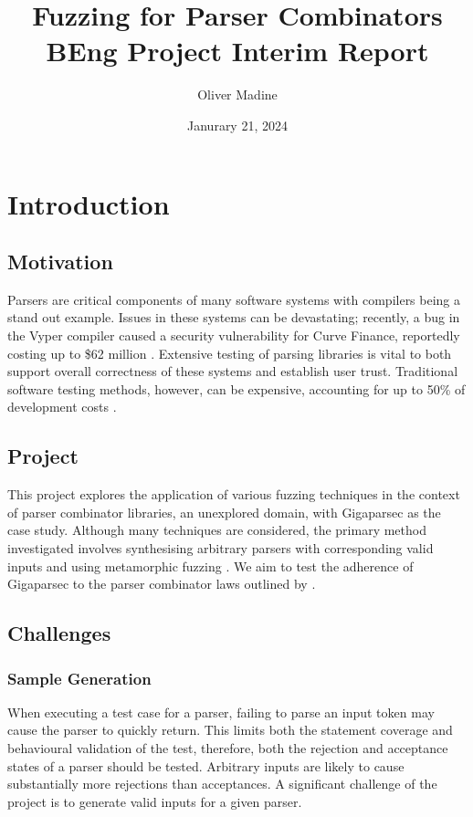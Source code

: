 \documentclass[11pt]{article}
\title{Fuzzing for Parser Combinators \\ {\large BEng Project Interim Report}}
\author{Oliver Madine}
\date{Janurary 21, 2024}
\let\oldciteauthor\citeauthor
\renewcommand{\citeauthor}[1]{\oldciteauthor{#1} \cite{#1}}
\begin{document}
\maketitle

\section{Introduction} %

\subsection{Motivation}
Parsers are critical components of many software systems with compilers being a stand out example. Issues in these systems can be devastating; recently, a bug in the Vyper compiler caused a security vulnerability for Curve Finance, reportedly costing up to \$62 million \cite{curve}. Extensive testing of parsing libraries is vital to both support overall correctness of these systems and establish user trust. Traditional software testing methods, however, can be expensive, accounting for up to 50\% of development costs \cite{quickcheck}.

\subsection{Project}
This project explores the application of various fuzzing techniques in the context of parser combinator libraries, an unexplored domain, with Gigaparsec \cite{gigaparsec} as the case study. Although many techniques are considered, the primary method investigated involves synthesising arbitrary parsers with corresponding valid inputs and using metamorphic fuzzing \cite{metamorphic}. We aim to test the adherence of Gigaparsec to the parser combinator laws outlined by \citeauthor{parsley}.

\subsection{Challenges}

\subsubsection{Sample Generation}
When executing a test case for a parser, failing to parse an input token may cause the parser to quickly return. This limits both the statement coverage and behavioural validation of the test, therefore, both the rejection and acceptance states of a parser should be tested. Arbitrary inputs are likely to cause substantially more rejections than acceptances. A significant challenge of the project is to generate valid inputs for a given parser. 
\end{document}
